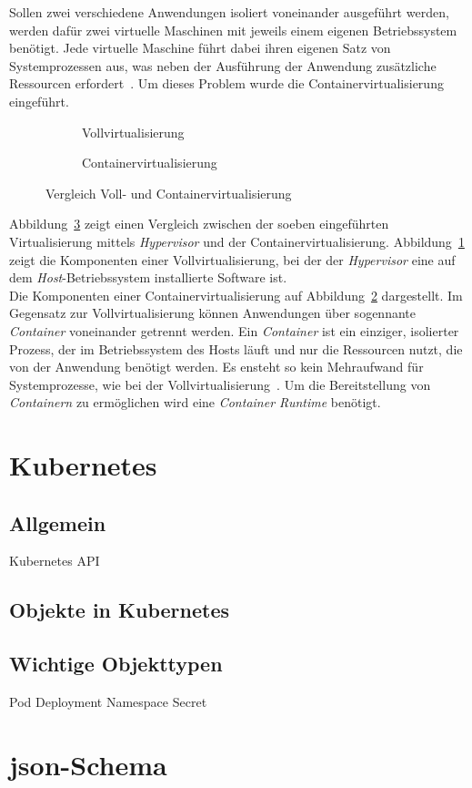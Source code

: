 Sollen zwei verschiedene Anwendungen isoliert voneinander ausgeführt werden, werden dafür zwei virtuelle Maschinen mit jeweils einem eigenen Betriebssystem benötigt.
Jede virtuelle Maschine führt dabei ihren eigenen Satz von Systemprozessen aus, was neben der Ausführung der Anwendung zusätzliche Ressourcen erfordert~\cite{kubernetes-in-action-introduction}.
Um dieses Problem wurde die Containervirtualisierung eingeführt.

\begin{figure}
    \centering
    \begin{subfigure}{.5\textwidth}
        \centering
        
        \caption{Vollvirtualisierung}
        \label{fig:full-virtualization}
    \end{subfigure}%
    \begin{subfigure}{.5\textwidth}
        \centering
        
        \caption{Containervirtualisierung}
        \label{fig:container-virtualization}
    \end{subfigure}
    \caption{Vergleich Voll- und Containervirtualisierung}
    \label{fig:virtualization-comparison}
\end{figure}

Abbildung~\ref{fig:virtualization-comparison} zeigt einen Vergleich zwischen der soeben eingeführten Virtualisierung mittels \textit{Hypervisor} und
der Containervirtualisierung.
Abbildung~\ref{fig:full-virtualization} zeigt die Komponenten einer Vollvirtualisierung, bei der der \textit{Hypervisor}
eine auf dem \textit{Host}-Betriebssystem installierte Software ist.
\\
Die Komponenten einer Containervirtualisierung auf Abbildung~\ref{fig:container-virtualization} dargestellt.
Im Gegensatz zur Vollvirtualisierung können Anwendungen über sogennante \textit{Container} voneinander getrennt werden.
Ein \textit{Container} ist ein einziger, isolierter Prozess, der im Betriebssystem des Hosts läuft und nur die Ressourcen nutzt, die von der Anwendung benötigt werden.
Es ensteht so kein Mehraufwand für Systemprozesse, wie bei der Vollvirtualisierung~\cite{kubernetes-in-action-introduction}.
Um die Bereitstellung von \textit{Containern} zu ermöglichen wird eine \textit{Container Runtime} benötigt.

\section{Kubernetes}

\subsection{Allgemein}

Kubernetes API

\subsection{Objekte in Kubernetes}

\subsection{Wichtige Objekttypen}

Pod
Deployment
Namespace
Secret

\section{\acs{json}-Schema}